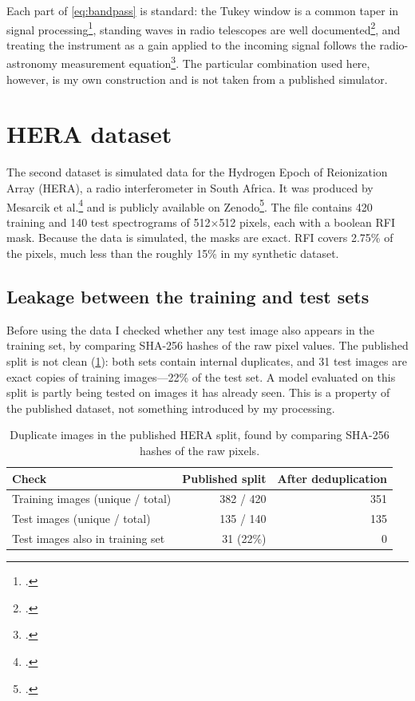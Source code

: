 Each part of \cref{eq:bandpass} is standard: the Tukey window is a common
taper in signal processing\footcite{harris1978}, standing waves in radio
telescopes are well documented\footcite{popping2008}, and treating the instrument
as a gain applied to the incoming signal follows the radio-astronomy
measurement equation\footcite{hamaker1996}. The particular combination used here,
however, is my own construction and is not taken from a published simulator.

\section{HERA dataset}
\label{sec:hera}
The second dataset is simulated data for the Hydrogen Epoch of Reionization
Array (HERA), a radio interferometer in South Africa. It was produced by
Mesarcik et al.\footcite{mesarcik2022} and is publicly available on
Zenodo\footcite{mesarcik2022data}. The file contains 420 training and 140 test
spectrograms of 512$\times$512 pixels, each with a boolean RFI mask. Because
the data is simulated, the masks are exact. RFI covers 2.75\% of the pixels,
much less than the roughly 15\% in my synthetic dataset.

\subsection{Leakage between the training and test sets}
Before using the data I checked whether any test image also appears in the
training set, by comparing SHA-256 hashes of the raw pixel values. The
published split is not clean (\cref{tab:hera_leak}): both sets contain
internal duplicates, and 31 test images are exact copies of training
images---22\% of the test set. A model evaluated on this split is partly being
tested on images it has already seen. This is a property of the published
dataset, not something introduced by my processing.

\begin{table}[H]
  \centering
  \caption{Duplicate images in the published HERA split, found by comparing
    SHA-256 hashes of the raw pixels.}
  \label{tab:hera_leak}
  \begin{tabular}{lrr}
    \toprule
    Check & Published split & After deduplication \\
    \midrule
    Training images (unique / total) & 382 / 420 & 351 \\
    Test images (unique / total)     & 135 / 140 & 135 \\
    Test images also in training set & 31 (22\%) & 0 \\
    \bottomrule
  \end{tabular}
\end{table}

